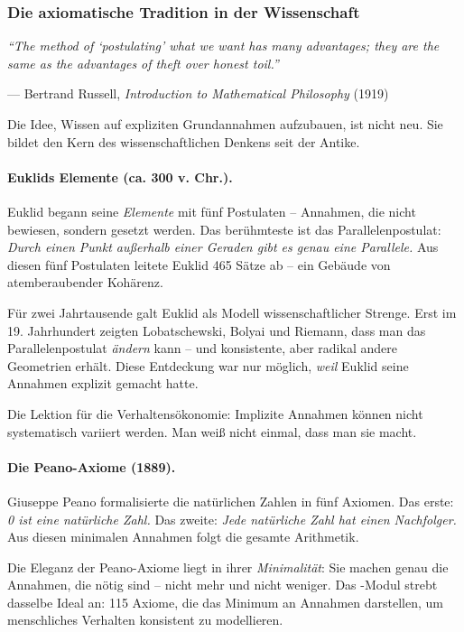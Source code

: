 \subsubsection{Die axiomatische Tradition in der Wissenschaft}

\epigraph{\textit{``The method of `postulating' what we want has many advantages; they are the same as the advantages of theft over honest toil.''}}{--- Bertrand Russell, \textit{Introduction to Mathematical Philosophy} (1919)}

Die Idee, Wissen auf expliziten Grundannahmen aufzubauen, ist nicht neu. Sie bildet den Kern des wissenschaftlichen Denkens seit der Antike.

\paragraph{Euklids Elemente (ca. 300 v. Chr.).}

Euklid begann seine \textit{Elemente} mit fünf Postulaten -- Annahmen, die nicht bewiesen, sondern gesetzt werden. Das berühmteste ist das Parallelenpostulat: \textit{Durch einen Punkt außerhalb einer Geraden gibt es genau eine Parallele.} Aus diesen fünf Postulaten leitete Euklid 465 Sätze ab -- ein Gebäude von atemberaubender Kohärenz.

Für zwei Jahrtausende galt Euklid als Modell wissenschaftlicher Strenge. Erst im 19. Jahrhundert zeigten Lobatschewski, Bolyai und Riemann, dass man das Parallelenpostulat \textit{ändern} kann -- und konsistente, aber radikal andere Geometrien erhält. Diese Entdeckung war nur möglich, \textit{weil} Euklid seine Annahmen explizit gemacht hatte.

Die Lektion für die Verhaltensökonomie: Implizite Annahmen können nicht systematisch variiert werden. Man weiß nicht einmal, dass man sie macht.

\paragraph{Die Peano-Axiome (1889).}

Giuseppe Peano formalisierte die natürlichen Zahlen in fünf Axiomen. Das erste: \textit{0 ist eine natürliche Zahl.} Das zweite: \textit{Jede natürliche Zahl hat einen Nachfolger.} Aus diesen minimalen Annahmen folgt die gesamte Arithmetik.

Die Eleganz der Peano-Axiome liegt in ihrer \textit{Minimalität}: Sie machen genau die Annahmen, die nötig sind -- nicht mehr und nicht weniger. Das \META-Modul strebt dasselbe Ideal an: 115 Axiome, die das Minimum an Annahmen darstellen, um menschliches Verhalten konsistent zu modellieren.

